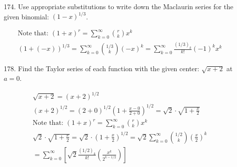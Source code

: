     \begin{itemize}
        \item [174.] Use appropriate substitutions to write down the Maclaurin series for the given binomial: $(1-x)^{1/3}$.
        \\
        \begin{mdframed}
            \begin{equation*}
                \begin{gathered}
                    \text{Note that: } (1+x)^{r} = 
                    \sum_{k=0}^{\infty}{r\choose k}x^{k}      \\
                    (1+(-x))^{1/3} = \sum_{k=0}^{\infty}{1/3 \choose k}(-x)^{k} =
                    \boxed{\sum_{k=0}^{\infty}\frac{(1/3)_{k}}{k!}(-1)^{k}x^{k}}
                \end{gathered}
            \end{equation*}
        \end{mdframed}

        \item [178.] Find the Taylor series of each function with the given center: $\sqrt{x+2}$ at $a = 0$.
        \\
        \begin{mdframed}
            \begin{equation*}
                \begin{gathered}
                    \sqrt{x+2} = (x+2)^{1/2}                            \\
                    (x+2)^{1/2} = 
                    (2+0)^{1/2}\left(1+\frac{x-0}{2+0}\right)^{1/2} =
                    \sqrt{2}\cdot\sqrt{1+\frac{x}{2}}                   \\
                    \text{Note that: } (1+x)^{r} = 
                    \sum_{k=0}^{\infty}{r\choose k}x^{k}                \\
                    \sqrt{2}\cdot\sqrt{1+\frac{x}{2}} =
                    \sqrt{2}\cdot\left(1+\frac{x}{2}\right)^{1/2} =
                    \sqrt{2}\sum_{k=0}^{\infty}
                    {1/2\choose k}\left(\frac{x}{2}\right)^{k}         \\
                    = \boxed{\sum_{k=0}^{\infty}\left[\sqrt{2}
                    \frac{(1/2)_{k}}{k!}\left(\frac{x^k}{2^{k-1/2}}\right)\right]}
                \end{gathered}
            \end{equation*}
        \end{mdframed}


\end{itemize}
